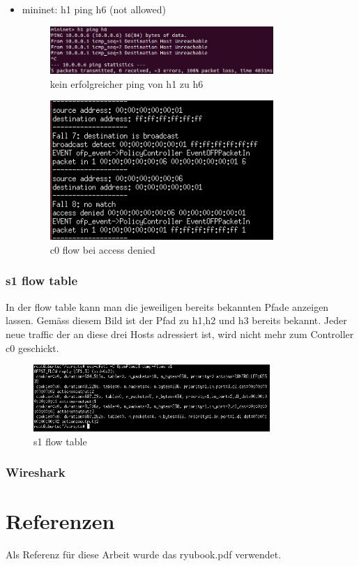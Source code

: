 \documentclass[a4,12pt]{scrartcl}
\begin{document}
\begin{itemize}
\item mininet: h1 ping h6 (not allowed)
\begin{figure} [H]
	\begin{center}
	\includegraphics[width=0.80\textwidth]{./pictures/h1_ping_h6_nok.png}
	\caption{kein erfolgreicher ping von h1 zu h6}
	\label{x}
	\end{center}
\end{figure} 
\begin{figure} [H]
	\begin{center}
	\includegraphics[width=0.80\textwidth]{./pictures/h1_ping_h6.png}
	\caption{c0 flow bei access denied}
	\label{x}
	\end{center}
\end{figure} 
\end{itemize}

\subsubsection{s1 flow table}
In der flow table kann man die jeweiligen bereits bekannten Pfade anzeigen lassen. Gemäss diesem Bild ist der Pfad zu h1,h2 und h3 bereits bekannt. Jeder neue traffic der an diese drei Hosts adressiert ist, wird nicht mehr zum Controller c0 geschickt. 
\begin{figure} [H]
	\begin{center}
	\includegraphics[width=0.80\textwidth]{./pictures/ex4_flow_table.png}
	\caption{s1 flow table}
	\label{x}
	\end{center}
\end{figure} 

\subsubsection{Wireshark}


\section{Referenzen}
Als Referenz für diese Arbeit wurde das ryubook.pdf verwendet. 
\end{document}

